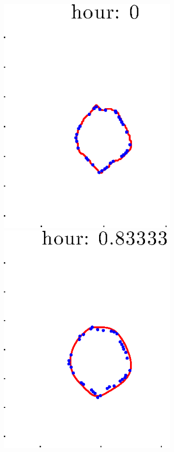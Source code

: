 \documentclass[12pt]{article}
\begin{document}
\begin{figure}[h!]
\begin{subfigure}[b]{.3\textwidth}
	\end{subfigure}
	\begin{subfigure}[b]{.3\textwidth}
	\centering
		\includegraphics[height=.15\textheight]{Pos14exp8/firsthalf/second1.eps}
		\includegraphics[height=.15\textheight]{Pos14exp8/firsthalf/second2.eps}

\end{subfigure}
\end{figure}
\end{document}
